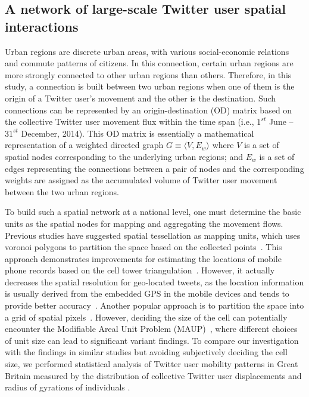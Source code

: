 \documentclass[10pt,letterpaper]{article}
\begin{document}
\subsection*{A network of large-scale Twitter user spatial interactions}
Urban regions are discrete urban areas, with various social-economic relations and commute patterns of citizens. 
In this connection, certain urban regions are more strongly connected to other urban regions than others.
Therefore, in this study, a connection is built between two urban regions when one of them is the origin of a Twitter user’s movement and the other is the destination. 
Such connections can be represented by an origin-destination (OD) matrix based on the collective Twitter user movement flux within the time span (i.e., $1^{st}$ June – $31^{st}$ December, 2014). 
This OD matrix is essentially a mathematical representation of a weighted directed graph $G\equiv\langle V, E_{w}\rangle$ where $V$ is a set of spatial nodes corresponding to the underlying urban regions; and $E_{w}$ is a set of edges representing the connections between a pair of nodes and the corresponding weights are assigned as the accumulated volume of Twitter user movement between the two urban regions.

To build such a spatial network at a national level, one must determine the basic units as the spatial nodes for mapping and aggregating the movement flows. 
Previous studies have suggested spatial tessellation as mapping units, which uses voronoi polygons to partition the space based on the collected points~\cite{rinzivillo2012,zhong2014}. 
This approach demonstrates improvements for estimating the locations of mobile phone records based on the cell tower triangulation~\cite{gonzalez2008,qian2013}.
However, it actually decreases the spatial resolution for geo-located tweets, as the location information is usually derived from the embedded GPS in the mobile devices and tends to provide better accuracy~\cite{sakaki2010,zandbergen2009}.
Another popular approach is to partition the space into a grid of spatial pixels~\cite{liuPopMobility,ratti2010}.
However, deciding the size of the cell can potentially encounter the Modifiable Areal Unit Problem (MAUP)~\cite{openshaw1984,wong2009}, where different choices of unit size can lead to significant variant findings.
To compare our investigation with the findings in similar studies but avoiding subjectively deciding the cell size, we performed statistical analysis of Twitter user mobility patterns in Great Britain measured by the distribution of collective Twitter user displacements and radius of gyrations of individuals \cite{gonzalez2008,jurdak2015}.
\end{document}
